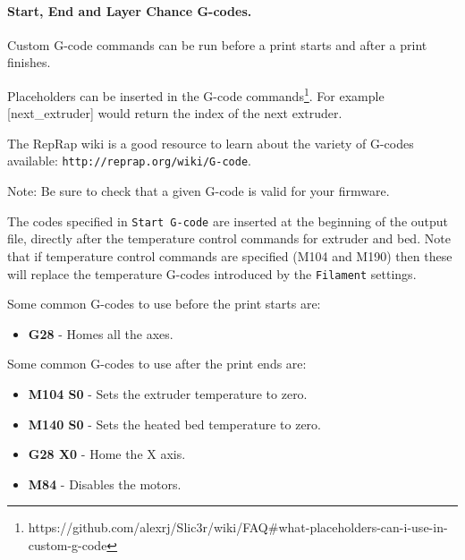 \paragraph{Start, End and Layer Chance G-codes.} %
\label{par:start_end_g_code}
Custom G-code commands can be run before a print starts and after a print finishes.

Placeholders can be inserted in the G-code commands\footnote{https://github.com/alexrj/Slic3r/wiki/FAQ\#what-placeholders-can-i-use-in-custom-g-code}.  For example [next\_extruder] would return the index of the next extruder.

The RepRap wiki is a good resource to learn about the variety of G-codes available: \texttt{http://reprap.org/wiki/G-code}.

Note: Be sure to check that a given G-code is valid for your firmware.

The codes specified in \texttt{Start G-code} are inserted at the beginning of the output file, directly after the temperature control commands for extruder and bed.  Note that if temperature control commands are specified (M104 and M190) then these will replace the temperature G-codes introduced by the \texttt{Filament} settings.

Some common G-codes to use before the print starts are:
\begin{itemize}
	\item \textbf{G28}  - Homes all the axes.
\end{itemize}


Some common G-codes to use after the print ends are:
\begin{itemize}
	\item \textbf{M104 S0}  - Sets the extruder temperature to zero.
	\item \textbf{M140 S0} - Sets the heated bed temperature to zero.
	\item \textbf{G28 X0} - Home the X axis.
	\item \textbf{M84}  - Disables the motors.
\end{itemize}

